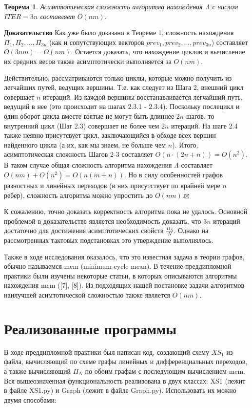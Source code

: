 \documentclass[a4paper,12pt]{extarticle}
\theoremstyle{plain} %
\newtheorem{theorem}{Теорема}
\begin{document}
\begin{large}
\begin{theorem}
Асимптотическая сложность алгоритма нахождения $\Lambda$ с числом $ITER = 3n$ составляет $O(nm)$.
\end{theorem}
\textbf{Доказательство}
Как уже было доказано в Теореме 1, сложность нахождения $\Pi_1, \Pi_2, ..., \Pi_{3n}$ (как и сопутствующих векторов $prev_1, prev_2, ..., prev_{3n}$) составляет $O(3nm) = O(nm)$. Остается доказать, что нахождение циклов и вычисление их средних весов также асимптотически выполняется за $O(nm)$.

Действительно, рассматриваются только циклы, которые можно получить из легчайших путей, ведущих вершины. Т.е. как следует из Шага 2, внешний цикл совершает $n$ итераций. Из каждой вершины восстанавливается легчайший путь, ведущий в нее (это происходит на шагах 2.3.1 - 2.3.4). Поскольку послецикл и один оборот цикла вместе взятые не могут быть длиннее $2n$ шагов, то внутренний цикл (Шаг 2.3) совершает не более чем $2n$ итераций. На шаге 2.4 также неявно присутсвует цикл, заключающийся в обходе всех вершин найденного цикла (а их, как мы знаем, не больше чем $n$). Итого, асимптотическая сложность Шагов 2-3 составляет $O(n \cdot (2n + n)) = O(n^2)$. В таком случае общая сложность алгоритма нахождения $\Lambda$ составляет $O(nm) + O(n^2) = O(n(m+n))$. Но в силу особенностей графов разностных и линейных переходов (в них присутствует по крайней мере $n$ ребер), сложность алгоритма можно упростить до $O(nm)$.$\boxtimes$
\bigskip

К сожалению, точно доказать корректность алгоритма пока не удалось. Основной проблемой в доказательстве является необходимость доказать, что $3n$ итераций достаточно для достижения асимптотических свойств $\frac{\Pi_N}{N}$. Однако на рассмотренных тактовых подстановках это утверждение выполнялось.

Также в ходе исследования оказалось, что это известная задача в теории графов, обычно называемся mcm (minimum cycle mean). В течение преддипломной практики были изучены некоторые статьи, в которых описываются алгоритмы нахождения mcm ([7], [8]). Из подходящих нашей постановке задачи алгоритмов наилучшей асимтотической сложностью также является $O(nm)$.

\newpage
\section{Реализованные программы}

В ходе преддипломной практики был написан код, создающий схему $XS_1$ из файла, вычисляющий по схеме графы линейных и дифференциальных переходов, а также вычисляющий $\Pi_N$ по обоим графам с последующим вычислением mcm. Вся вышеозначенная функциональность реализована в двух классах: XS1 (лежит в файле XS1.py) и Graph (лежит в файле Graph.py). Использовать их можно двумя способами:


\end{large}
\end{document}
